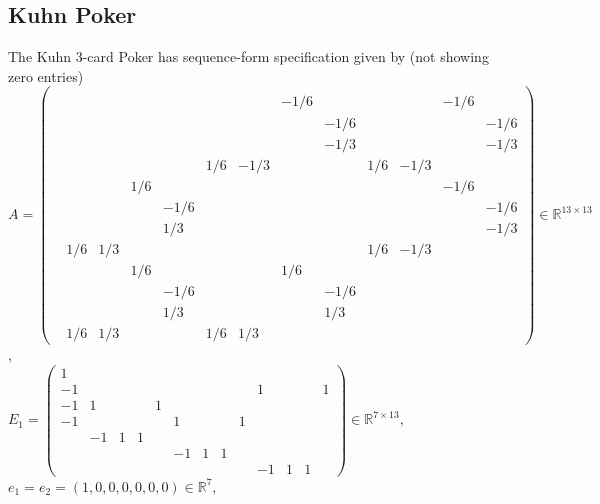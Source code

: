 \documentclass[a4paper,9pt,journal]{IEEEtran}
\begin{document}
\subsection{Kuhn Poker}
The Kuhn 3-card Poker has sequence-form specification given by (not showing zero entries)\\
$A = \left(\begin{array}{ccccccccccccc}
  &   &   &   &   &   &   &   &   &   &   &   &  \\
  &   &   &   &   &   &   & -1 / 6 &   &   &   & -1 / 6 &  \\
  &   &   &   &   &   &   &   & -1 / 6 &   &   &   & -1 / 6\\
  &   &   &   &   &   &   &   & -1 / 3 &   &   &   & -1 / 3\\
  &   &   &   &   & 1 / 6 & -1 / 3 &   &   & 1 / 6 & -1 / 3 &   &  \\
  &   &   & 1 / 6 &   &   &   &   &   &   &   & -1 / 6 &  \\
  &   &   &   & -1 / 6 &   &   &   &   &   &   &   & -1 / 6\\
  &   &   &   & 1 / 3 &   &   &   &   &   &   &   & -1 / 3\\
  & 1 / 6 & 1 / 3 &   &   &   &   &   &   & 1 / 6 & -1 / 3 &   &  \\
  &   &   & 1 / 6 &   &   &   & 1 / 6 &   &   &   &   &  \\
  &   &   &   & -1 / 6 &   &   &   & -1 / 6 &   &   &   &  \\
  &   &   &   & 1 / 3 &   &   &   & 1 / 3 &   &   &   &  \\
  & 1 / 6 & 1 / 3 &   &   & 1 / 6 & 1 / 3 &   &   &   &   &   &  
\end{array}\right)
 \in \mathbb{R}^{13 \times 13}$,\\
$E_1 = \left(\begin{array}{ccccccccccccc}
1 &   &   &   &   &   &   &   &   &   &   &   &  \\
-1 &   &   &   &   &   &   &   &   & 1 &   &   & 1\\
-1 & 1 &   &   & 1 &   &   &   &   &   &   &   &  \\
-1 &   &   &   &   & 1 &   &   & 1 &   &   &   &  \\
  & -1 & 1 & 1 &   &   &   &   &   &   &   &   &  \\
  &   &   &   &   & -1 & 1 & 1 &   &   &   &   &  \\
  &   &   &   &   &   &   &   &   & -1 & 1 & 1 &  
\end{array}\right)  \in \mathbb{R}^{7 \times 13}$, $e_1 = e_2 = (1, 0, 0, 0, 0, 0, 0) \in \mathbb{R}^7$,\\
\end{document}
